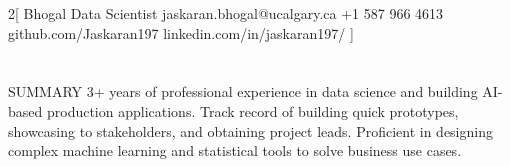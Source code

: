 \documentclass{my_cv}
\begin{document}
\begin{multicols}{2}[
        {Bhogal}%
        {Data Scientist}%
        {jaskaran.bhogal@ucalgary.ca}%
        {+1 587 966 4613}%
        {github.com/Jaskaran197}%
        {linkedin.com/in/jaskaran197/}%
]
\end{multicols}

\section{\faFileText}{SUMMARY}
3+ years of professional experience in data science and building AI-based production  applications. Track record of building
quick prototypes, showcasing to stakeholders, and obtaining project leads. Proficient in designing complex machine learning and statistical tools to solve business use cases.
\end{document}

